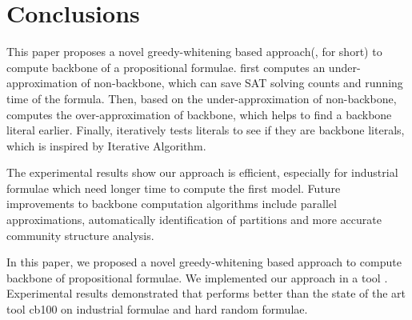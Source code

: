 \section{Conclusions}\label{sec:conc}
This paper proposes a novel greedy-whitening based approach(\tool, for short) to compute backbone of a propositional formulae.
\tool first computes an under-approximation of non-backbone, which can save SAT solving counts and running time of the formula.
Then, based on the under-approximation of non-backbone, \tool computes the over-approximation of backbone, which helps \tool to find a backbone literal earlier.
Finally, \tool iteratively tests literals to see if they are backbone literals, which is inspired by Iterative Algorithm.

The experimental results show our approach is efficient, especially for industrial formulae which need longer time to compute the first model.
Future improvements to backbone computation algorithms include parallel approximations, automatically identification of partitions and more accurate community structure analysis.


In this paper, we proposed a novel greedy-whitening based approach \tool to compute backbone of propositional formulae.
We implemented our approach in a tool \tool. Experimental results demonstrated that
\tool performs better than the state of the art tool cb100 on industrial formulae and hard random formulae.


